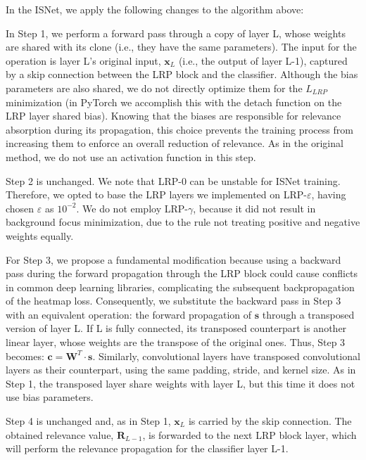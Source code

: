 \documentclass[fleqn,10pt]{wlscirep}
\begin{document}
{In the ISNet, we apply the following changes to the algorithm above:

In Step 1, we perform a forward pass through a copy of layer L, whose weights are shared with its clone (i.e., they have the same parameters). The input for the operation is layer L's original input, $\bm{x}_{L}$ (i.e., the output of layer L-1), captured by a skip connection between the LRP block and the classifier. Although the bias parameters are also shared, we do not directly optimize them for the $L_{LRP}$ minimization (in PyTorch we accomplish this with the detach function on the LRP layer shared bias). Knowing that the biases are responsible for relevance absorption during its propagation\cite{LRP}, this choice prevents the training process from increasing them to enforce an overall reduction of relevance. As in the original method, we do not use an activation function in this step.

Step 2 is unchanged. We note that LRP-0 can be unstable for ISNet training. Therefore, we opted to base the LRP layers we implemented on LRP-$\varepsilon$, having chosen $\varepsilon$ as $10^{-2}$. We do not employ LRP-$\gamma$, because it did not result in background focus minimization, due to the rule not treating positive and negative weights equally\cite{LRPBook}.

For Step 3, we propose a fundamental modification because using a backward pass during the forward propagation through the LRP block could cause conflicts in common deep learning libraries, complicating the subsequent backpropagation of the heatmap loss. Consequently, we substitute the backward pass in Step 3 with an equivalent operation: the forward propagation of $\bm{s}$ through a transposed version of layer L. If L is fully connected, its transposed counterpart is another linear layer, whose weights are the transpose of the original ones. Thus, Step 3 becomes: $\bm{c}=\bm{W}^{T} \cdot \bm{s}$. Similarly, convolutional layers have transposed convolutional layers as their counterpart, using the same padding, stride, and kernel size. As in Step 1, the transposed layer share weights with layer L, but this time it does not use bias parameters.

Step 4 is unchanged and, as in Step 1, $\bm{x}_{L}$ is carried by the skip connection. The obtained relevance value, $\bm{R}_{L-1}$, is forwarded to the next LRP block layer, which will perform the relevance propagation for the classifier layer L-1. 

}
\end{document}
